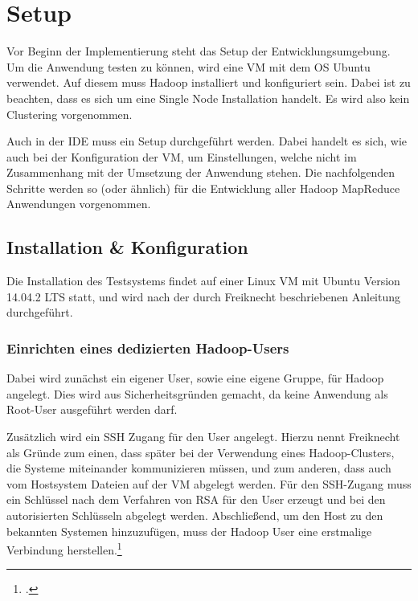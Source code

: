 
\chapter{Setup}\label{cha:Setup}
Vor Beginn der Implementierung steht das Setup der Entwicklungsumgebung. Um die Anwendung testen zu können, wird eine \ac{VM} mit dem \ac{OS} Ubuntu verwendet. Auf diesem muss Hadoop installiert und konfiguriert sein. Dabei ist zu beachten, dass es sich um eine Single Node Installation handelt. Es wird also kein Clustering vorgenommen.

Auch in der \ac{IDE} muss ein Setup durchgeführt werden. Dabei handelt es sich, wie auch bei der Konfiguration der \ac{VM}, um Einstellungen, welche nicht im Zusammenhang mit der Umsetzung der Anwendung stehen. Die nachfolgenden Schritte werden so (oder ähnlich) für die Entwicklung aller Hadoop MapReduce Anwendungen vorgenommen.


\section{Installation \& Konfiguration}\label{sec:InstallationHadoop}
Die Installation des Testsystems findet auf einer Linux \ac{VM} mit Ubuntu Version 14.04.2 \ac{LTS} statt, und wird nach der durch Freiknecht beschriebenen Anleitung durchgeführt. 

\subsection{Einrichten eines dedizierten Hadoop-Users}
Dabei wird zunächst ein eigener User, sowie eine eigene Gruppe, für Hadoop angelegt. Dies wird aus Sicherheitsgründen gemacht, da keine Anwendung als Root-User ausgeführt werden darf.

Zusätzlich wird ein \ac{SSH} Zugang für den User angelegt. Hierzu nennt Freiknecht als Gründe zum einen, dass später bei der Verwendung eines Hadoop-Clusters, die Systeme miteinander kommunizieren müssen, und zum anderen, dass auch vom Hostsystem Dateien auf der \ac{VM} abgelegt werden. Für den \ac{SSH}-Zugang muss ein Schlüssel nach dem Verfahren von \ac{RSA} für den User erzeugt und bei den autorisierten Schlüsseln abgelegt werden. Abschließend, um den Host zu den bekannten Systemen hinzuzufügen, muss der Hadoop User eine erstmalige Verbindung herstellen.\footcite[Vgl.][S. 30 f.]{Freiknecht.2014}

